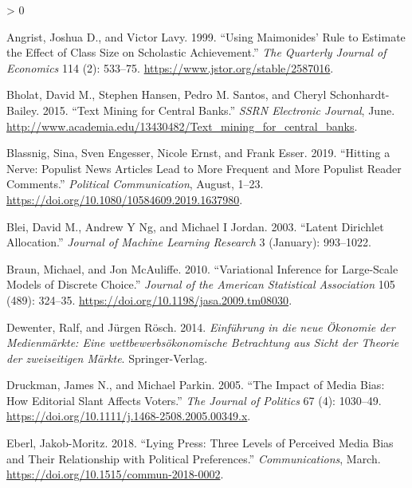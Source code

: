 \documentclass[
]{article}
\newlength{\cslhangindent}
\newenvironment{CSLReferences}[2] %
 {%
  \setlength{\parindent}{0pt}
  \ifodd #1 \everypar{\setlength{\hangindent}{\cslhangindent}}\ignorespaces\fi
  \ifnum #2 > 0
  \setlength{\parskip}{#2\baselineskip}
  \fi
 }%
 {}
\begin{document}
\hypertarget{refs}{}
\begin{CSLReferences}{1}{0}
\leavevmode\hypertarget{ref-angrist_using_1999}{}%
Angrist, Joshua D., and Victor Lavy. 1999. {``Using Maimonides' Rule to
Estimate the Effect of Class Size on Scholastic Achievement.''}
\emph{The Quarterly Journal of Economics} 114 (2): 533--75.
\url{https://www.jstor.org/stable/2587016}.

\leavevmode\hypertarget{ref-bholat_text_2015}{}%
Bholat, David M., Stephen Hansen, Pedro M. Santos, and Cheryl
Schonhardt-Bailey. 2015. {``Text Mining for Central Banks.''}
\emph{{SSRN} Electronic Journal}, June.
\url{http://www.academia.edu/13430482/Text_mining_for_central_banks}.

\leavevmode\hypertarget{ref-blassnig_hitting_2019}{}%
Blassnig, Sina, Sven Engesser, Nicole Ernst, and Frank Esser. 2019.
{``Hitting a Nerve: Populist News Articles Lead to More Frequent and
More Populist Reader Comments.''} \emph{Political Communication},
August, 1--23. \url{https://doi.org/10.1080/10584609.2019.1637980}.

\leavevmode\hypertarget{ref-blei_latent_2003}{}%
Blei, David M., Andrew Y Ng, and Michael I Jordan. 2003. {``Latent
Dirichlet Allocation.''} \emph{Journal of Machine Learning Research} 3
(January): 993--1022.

\leavevmode\hypertarget{ref-braun_variational_2010}{}%
Braun, Michael, and Jon McAuliffe. 2010. {``Variational Inference for
Large-Scale Models of Discrete Choice.''} \emph{Journal of the American
Statistical Association} 105 (489): 324--35.
\url{https://doi.org/10.1198/jasa.2009.tm08030}.

\leavevmode\hypertarget{ref-dewenter_einfuhrung_2014}{}%
Dewenter, Ralf, and Jürgen Rösch. 2014. \emph{Einführung in die neue
Ökonomie der Medienmärkte: Eine wettbewerbsökonomische Betrachtung aus
Sicht der Theorie der zweiseitigen Märkte}. Springer-Verlag.

\leavevmode\hypertarget{ref-druckman_impact_2005}{}%
Druckman, James N., and Michael Parkin. 2005. {``The Impact of Media
Bias: How Editorial Slant Affects Voters.''} \emph{The Journal of
Politics} 67 (4): 1030--49.
\url{https://doi.org/10.1111/j.1468-2508.2005.00349.x}.

\leavevmode\hypertarget{ref-eberl_lying_2018}{}%
Eberl, Jakob-Moritz. 2018. {``Lying Press: Three Levels of Perceived
Media Bias and Their Relationship with Political Preferences.''}
\emph{Communications}, March.
\url{https://doi.org/10.1515/commun-2018-0002}.


\end{CSLReferences}
\end{document}
